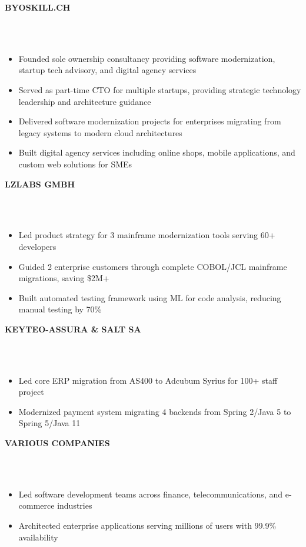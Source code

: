 \documentclass[10pt]{article}
\newcommand{\sectionsep}{\vspace{1.5pt}}
\newcommand{\runsubsection}[1]{
  \vspace{0.5pt}
  \color{subheadings}\fontsize{10pt}{11.5pt}\selectfont\bfseries\uppercase{#1}\normalfont
}
\newcommand{\descript}[1]{
  \color{subheadings}\fontsize{8pt}{9.5pt}\selectfont{#1}\normalfont\\[0.25pt]
}
\newcommand{\location}[1]{
  \color{headings}\fontsize{7pt}{8.5pt}\selectfont{#1}\normalfont\\[0.25pt]
}
\newenvironment{tightemize}{
\vspace{0pt}
\begin{itemize}[
  label=\textbullet,
  leftmargin=9pt,
  itemsep=0.25pt,
  parsep=0pt,
  topsep=0.25pt,
  partopsep=0pt
]
}{\end{itemize}\vspace{0.25pt}}
\begin{document}
\begin{paracol}{2}
\runsubsection{byoskill.ch}
\descript{| Founder \& Principal Consultant}
\location{2017 – Present | Switzerland}
\begin{tightemize}
\item Founded sole ownership consultancy providing software modernization, startup tech advisory, and digital agency services
\item Served as part-time CTO for multiple startups, providing strategic technology leadership and architecture guidance
\item Delivered software modernization projects for enterprises migrating from legacy systems to modern cloud architectures
\item Built digital agency services including online shops, mobile applications, and custom web solutions for SMEs
\end{tightemize}
\sectionsep

\runsubsection{LzLabs GMBH}
\descript{| Product Owner / Solution Architect}
\location{Sep 2021 – Dec 2022 | Zurich, Switzerland}
\begin{tightemize}
\item Led product strategy for 3 mainframe modernization tools serving 60+ developers
\item Guided 2 enterprise customers through complete COBOL/JCL mainframe migrations, saving \$2M+
\item Built automated testing framework using ML for code analysis, reducing manual testing by 70\%
\end{tightemize}
\sectionsep

\runsubsection{Keyteo-Assura \& SALT SA}
\descript{| Technical Leader / Solution Architect}
\location{2020 – 2021 | Switzerland}
\begin{tightemize}
\item Led core ERP migration from AS400 to Adcubum Syrius for 100+ staff project
\item Modernized payment system migrating 4 backends from Spring 2/Java 5 to Spring 5/Java 11
\end{tightemize}
\sectionsep

\runsubsection{Various Companies}
\descript{| Senior Software Engineer / Technical Lead}
\location{2016 – 2020 | Europe}
\begin{tightemize}
\item Led software development teams across finance, telecommunications, and e-commerce industries
\item Architected enterprise applications serving millions of users with 99.9\% availability
\end{tightemize}
\sectionsep


\end{paracol}
\end{document}
